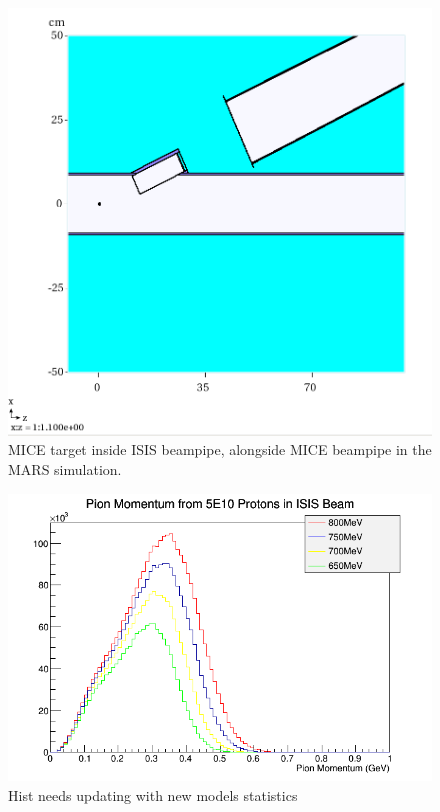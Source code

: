 \documentclass[a4paper,11pt]{article}
\begin{document}
\begin{figure}[t!]
  \begin{center}
    \includegraphics[width=1.0\columnwidth]{./figures/XZGeom-v6-Q1-y=6cm.png}
    \caption{MICE target inside ISIS beampipe, alongside MICE beampipe in the MARS simulation. }
    \label{fig:MARSXZ}
  \end{center}
\end{figure}

\begin{figure}[t!]
  \begin{center}
    \includegraphics[width=1.0\columnwidth]{./figures/PiMomentum.png}
    \caption{Hist needs updating with new models statistics}
    \label{fig:PiMomentum}
  \end{center}
\end{figure}
\end{document}
